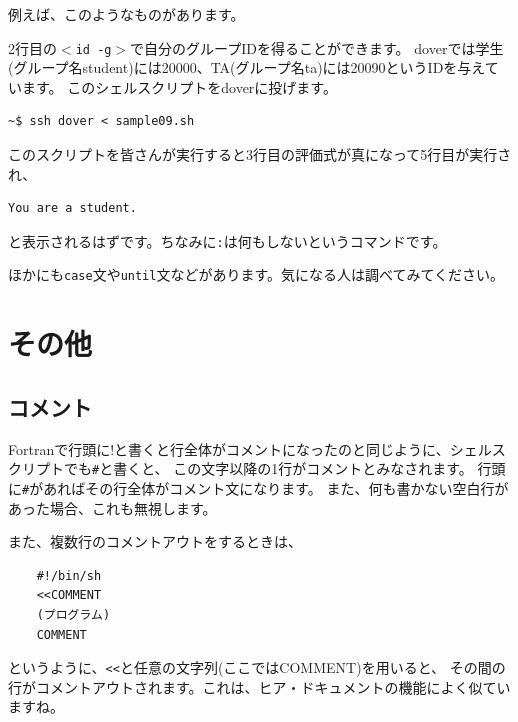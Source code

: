 \documentclass[a4j]{ltjreport}
\begin{document}
    例えば、このようなものがあります。
    
    2行目の$<$\texttt{id -g}$>$で自分のグループIDを得ることができます。
    doverでは学生(グループ名student)には20000、TA(グループ名ta)には20090というIDを与えています。
    このシェルスクリプトをdoverに投げます。\\

    \begin{lstlisting}[numbers=none]
    ~$ ssh dover < sample09.sh
    \end{lstlisting}
    このスクリプトを皆さんが実行すると3行目の評価式が真になって5行目が実行され、
    \begin{lstlisting}[numbers=none]
    You are a student.
    \end{lstlisting}
    と表示されるはずです。ちなみに\texttt{:}は何もしないというコマンドです。

    ほかにも\texttt{case}文や\texttt{until}文などがあります。気になる人は調べてみてください。



    \section{その他}

    \subsection{コメント}
    Fortranで行頭に!と書くと行全体がコメントになったのと同じように、シェルスクリプトでも\texttt{\#}と書くと、
    この文字以降の1行がコメントとみなされます。
    行頭に\texttt{\#}があればその行全体がコメント文になります。
    また、何も書かない空白行があった場合、これも無視します。

    また、複数行のコメントアウトをするときは、
    \begin{lstlisting}
    #!/bin/sh
    <<COMMENT
    (プログラム)
    COMMENT
    \end{lstlisting}
    というように、\texttt{<<}と任意の文字列(ここではCOMMENT)を用いると、
    その間の行がコメントアウトされます。これは、ヒア・ドキュメントの機能によく似ていますね。
\end{document}
